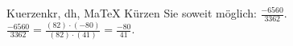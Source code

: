 \begin{MAufgabe}{Kuerzen}{kr, dh, MaTeX}
K\"urzen Sie soweit m\"oglich: $\frac{-6560}{3362}$.\\ 
\ifLsg\MLoesung
\quad $\frac{-6560}{3362}=\frac{(82)\cdot(-80)}{(82)\cdot(41)}=\frac{-80}{41}$.\else\relax\fi
 \end{MAufgabe}